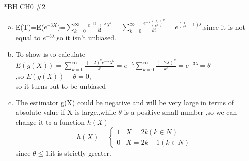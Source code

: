 \documentclass{article}
\begin{document}
\begin{homeworkProblem}*{BH CH0 \#2}
	\begin{enumerate}[(a)]
\item E(T)=E($e^{-3X}$)=$\sum_{k=0}^{\infty}\frac{e^{-3k}\cdot e^{-\lambda}\lambda^k}{k!}=\sum_{k=0}^{\infty}\frac{e^{-\lambda}(\frac{\lambda}{e^3})^k}{k!}=e^{(\frac{1}{e^3}-1)\lambda}$,since it is not equal to $e^{-3\lambda}$,so it isn't unbiased.
\item To show is to calculate $E(g(X))=\sum_{k=0}^{\infty}\frac{(-2)^{k} e^{-\lambda} \lambda ^k}{k!}=e^{-\lambda}\sum_{k=0}^{\infty}\frac{(-2\lambda)^{k}}{k!}=e^{-3\lambda}=\theta$\\
,so $E(g(X))-\theta=0$,\\so it turns out to be unbiased
\item The estimator g(X) could be negative and will be very large in terms of absolute value if X is large,,while $\theta $ is  a positive small number ,so we can change it to a function $h(X)$
$$
h(X)=	
\begin{cases}
	1 & X=2k(k\in N)\\
	0 & X=2k+1(k\in N)
\end{cases}
$$
since $\theta\leq 1$,it is strictly greater.
\end{enumerate}


\end{homeworkProblem}
\end{document}
